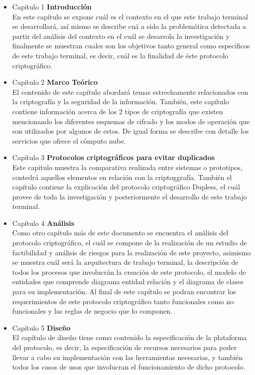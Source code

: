 \begin{itemize}
	\item Capítulo 1 \textbf{Introducción} \\
                     En este capítulo se expone cuál es el contexto en el que este trabajo terminal se desarrollará, así mismo se describe cuá a sido la problemática detectada a partir del análisis del contexto en el cuál se desarrola la investigación y finalmente se muestran cuales son los objetivos tanto general como específicos de este trabajo terminal, es decir, cuál es la finalidad de éste protocolo criptográfico. 

	\item Capítulo 2 \textbf{Marco Teórico} \\
El contenido de este capítulo abordará temas estrechamente relacionados con la criptografía y la seguridad de la información. También, este capítulo contiene información acerca de los 2 tipos de criptografía que existen mencionando los diferentes esquemas de cifrado y los modos de operación que son utilizados por algunos de estos. De igual forma se describe con detalle los servicios que ofrece el cómputo nube. 

	\item Capítulo 3 \textbf{Protocolos criptográficos para evitar duplicados} \\
	Este capitulo muestra la comparativa realizada entre sistemas o prototipos, contedrá aquellos elementos en relación con la criptoggrafía. También el capítulo contiene la explicación del protocolo criptográfico Dupless, el cuál provee de toda la investigación y posteriormente el desarrollo de este trabajo terminal.

	\item Capítulo 4 \textbf{Análisis} \\
	Como otro capítulo más de este documento se encuentra el análisis del protocolo criptográfico, el cuál se compone de la realización de un estudio de factibilidad y análisis de riesgos para la realización de este proyecto, asimismo se muestra cuál será la arquitectura de trabajo terminal, la descripción de todos los procesos que involucrán la creación de este protocolo, el modelo de entidades que comprende diagrama entidad relación y el diagrama de clases para su implementación. Al final de este capítulo se podran encontrar los requerimientos de este protocolo criptográfico tanto funcionales como no funcionales y las reglas de negocio que lo componen.

	\item Capítulo 5 \textbf{Diseño} \\
	El capítulo de diseño tiene como contenido la especificación de la plataforma del protocolo, es decir, la especificación de recursos necesarios para poder llevar a cabo su implementación con las herramientas necesarias, y también todos los casos de usos que involucran el funcionamiento de dicho protocolo.

\end{itemize}




    